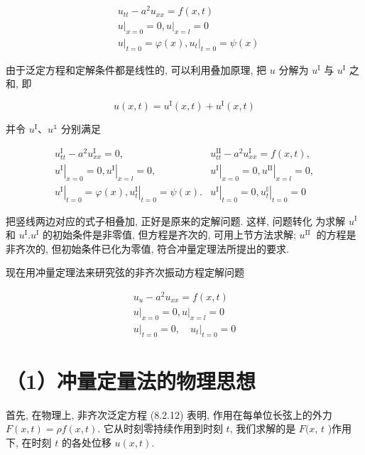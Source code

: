 \begin{solution}
$$
\begin{aligned}
& u_{t t}-a^{2} u_{x x}=f(x, t) \\
& \left.u\right|_{x=0}=0,\left.u\right|_{x=l}=0 \\
& \left.u\right|_{t=0}=\varphi(x),\left.u_{t}\right|_{t=0}=\psi(x)
\end{aligned}
$$

由于泛定方程和定解条件都是线性的, 可以利用叠加原理, 把 $u$ 分解为 $u^{\mathrm{I}}$ 与 $u^{\mathrm{I}}$ 之和, 即

$$
u(x, t)=u^{\mathrm{I}}(x, t)+u^{\mathrm{I}}(x, t)
$$

并令 $u^{\mathrm{I}} 、 u^{\mathbb{1}}$ 分别满足

$$
\begin{array}{l|l}
u_{t t}^{\mathrm{I}}-a^{2} u_{x x}^{\mathrm{I}}=0, & u_{t t}^{\mathrm{II}}-a^{2} u_{x x}^{\mathrm{I}}=f(x, t), \\
\left.u^{\mathrm{I}}\right|_{x=0}=0,\left.u^{\mathrm{I}}\right|_{x=l}=0, & \left.u^{\mathrm{I}}\right|_{x=0}=0,\left.u^{\mathrm{II}}\right|_{x=l}=0, \\
\left.u^{\mathrm{I}}\right|_{t=0}=\varphi(x),\left.u_{t}^{\mathrm{I}}\right|_{t=0}=\psi(x) . & \left.u^{\mathrm{I}}\right|_{t=0}=0,\left.u_{t}^{\mathbb{I}}\right|_{t=0}=0
\end{array}
$$

把竖线两边对应的式子相叠加, 正好是原来的定解问题. 这样, 问题转化
为求解 $u^{\mathrm{I}}$ 和 $u^{\mathrm{I}} . u^{\mathrm{I}}$ 的初始条件是非零值, 但方程是齐次的, 可用上节方法求解; $u^{\text {II }}$ 的方程是非齐次的, 但初始条件已化为零值, 符合冲量定理法所提出的要求.

现在用冲量定理法来研究弦的非齐次振动方程定解问题

$$
\begin{gathered}
u_{u}-a^{2} u_{x x}=f(x, t) \\
\left.u\right|_{x=0}=0,\left.u\right|_{x=l}=0 \\
\left.u\right|_{t=0}=0,\left.\quad u_{t}\right|_{t=0}=0
\end{gathered}
$$

\section{（1）冲量定量法的物理思想}
首先, 在物理上, 非齐次泛定方程 (8.2.12) 表明, 作用在每单位长弦上的外力 $F(x, t)=\rho f(x, t)$. 它从时刻零持续作用到时刻 $t$, 我们求解的是 $F(x$, $t$ )作用下, 在时刻 $t$ 的各处位移 $u(x, t)$.


\end{solution}
